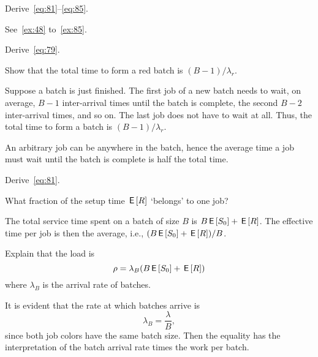 \begin{exercise}\label{ex:85}
  Derive~\cref{eq:81}--\cref{eq:85}.
\begin{solution}
    See~\cref{ex:48} to~\cref{ex:85}.
\end{solution}
\end{exercise}

\begin{extra}\label{ex:48}
  Derive~\cref{eq:79}.
\begin{hint}
 Show that the total time to form a red batch is $(B-1)/\lambda_r$. 
\end{hint}
\begin{solution}
  Suppose a batch is just finished. The first job of a new batch needs to wait, on average, $B-1$  inter-arrival times until the batch is complete, the second $B-2$ inter-arrival times, and so on. The last job does not have to wait at all. Thus, the total time to form a batch is $(B-1)/\lambda_r$. 

An arbitrary job can be anywhere in the batch, hence the average time a job must wait until the batch is complete is half the total time. 
\end{solution}
\end{extra}


\begin{extra}
  Derive~\cref{eq:81}.
\begin{hint}
    What fraction of the setup time $\,\mathsf{E}\left[R\right]$ `belongs' to one job?
\end{hint}
\begin{solution}
    The total service time spent on a batch of size $B$ is $B \,\mathsf{E}\left[S_0\right] + \,\mathsf{E}\left[R\right]$. The effective time per job is then the average, i.e.,  $(B \,\mathsf{E}\left[S_0\right]+\,\mathsf{E}\left[R\right])/B$. 
\end{solution}
\end{extra}

\begin{extra}
Explain that the load is 
\begin{equation*}
\rho = \lambda_B (B \,\mathsf{E}\left[S_0\right] + \,\mathsf{E}\left[R\right])
\end{equation*}
where $\lambda_B$ is the arrival rate of batches. 
\begin{solution}
It is evident that the  rate at which batches arrive is 
\begin{equation*}
  \lambda_B = \frac \lambda B,
\end{equation*}
since both job colors have the same batch size.  
Then  the equality has the interpretation of the batch arrival rate times the work per batch.
\end{solution}
\end{extra}


